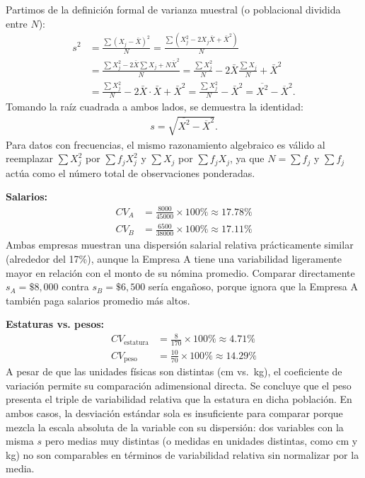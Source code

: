 \begin{solproblema}[prob:6112df0]
	Partimos de la definición formal de varianza muestral (o poblacional dividida entre $N$):
	\begin{align}
		s^2 &= \frac{\sum (X_j - \bar{X})^2}{N} = \frac{\sum (X_j^2 - 2X_j\bar{X} + \bar{X}^2)}{N} \\
		&= \frac{\sum X_j^2 - 2\bar{X}\sum X_j + N\bar{X}^2}{N} = \frac{\sum X_j^2}{N} - 2\bar{X}\frac{\sum X_j}{N} + \bar{X}^2 \\
		&= \frac{\sum X_j^2}{N} - 2\bar{X}\cdot\bar{X} + \bar{X}^2 = \frac{\sum X_j^2}{N} - \bar{X}^2 = \overline{X^2} - \overline{X}^2.
	\end{align}
	Tomando la raíz cuadrada a ambos lados, se demuestra la identidad:
	\begin{align}
		s = \sqrt{\overline{X^2} - \overline{X}^2}.
	\end{align}
	Para datos con frecuencias, el mismo razonamiento algebraico es válido al reemplazar $\sum X_j^2$ por $\sum f_j X_j^2$ y $\sum X_j$ por $\sum f_j X_j$, ya que $N=\sum f_j$ y $\sum f_j$ actúa como el número total de observaciones ponderadas.
\end{solproblema}

\begin{solproblema}[prob:dd18a2e]
	\textbf{Salarios:}
	\begin{align}
		CV_A &= \frac{8000}{45000} \times 100\% \approx 17.78\% \\
		CV_B &= \frac{6500}{38000} \times 100\% \approx 17.11\%
	\end{align}
	Ambas empresas muestran una dispersión salarial relativa prácticamente similar (alrededor del 17\%), aunque la Empresa A tiene una variabilidad ligeramente mayor en relación con el monto de su nómina promedio. Comparar directamente $s_A=\$8{,}000$ contra $s_B=\$6{,}500$ sería engañoso, porque ignora que la Empresa A también paga salarios promedio más altos.

	\textbf{Estaturas vs. pesos:}
	\begin{align}
		CV_{\text{estatura}} &= \frac{8}{170} \times 100\% \approx 4.71\% \\
		CV_{\text{peso}} &= \frac{10}{70} \times 100\% \approx 14.29\%
	\end{align}
	A pesar de que las unidades físicas son distintas (cm vs.\ kg), el coeficiente de variación permite su comparación adimensional directa. Se concluye que el peso presenta el triple de variabilidad relativa que la estatura en dicha población. En ambos casos, la desviación estándar sola es insuficiente para comparar porque mezcla la escala absoluta de la variable con su dispersión: dos variables con la misma $s$ pero medias muy distintas (o medidas en unidades distintas, como cm y kg) no son comparables en términos de variabilidad relativa sin normalizar por la media.
\end{solproblema}

